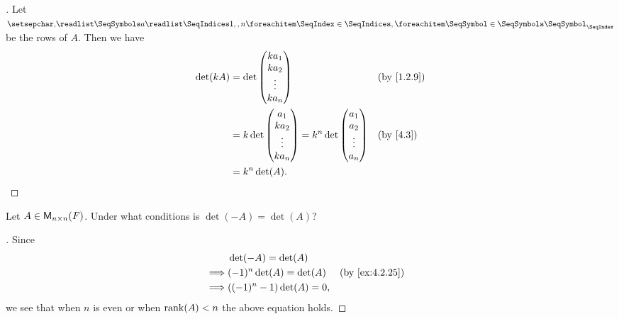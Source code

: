 \begin{proof}[]
	Let \(\seq{a}{1,,n}\) be the rows of \(A\).
	Then we have
	\begin{align*}
		\det(kA) & = \det\begin{pmatrix}
			                 k a_1  \\
			                 k a_2  \\
			                 \vdots \\
			                 k a_n
		                 \end{pmatrix}                   &  & \by{1.2.9}       \\
		         & = k \det\begin{pmatrix}
			                   a_1    \\
			                   k a_2  \\
			                   \vdots \\
			                   k a_n
		                   \end{pmatrix} = k^n \det\begin{pmatrix}
			                                           a_1    \\
			                                           a_2    \\
			                                           \vdots \\
			                                           a_n
		                                           \end{pmatrix} &  & \by{4.3} \\
		         & = k^n \det(A).
	\end{align*}
\end{proof}

\begin{ex}\label{ex:4.2.26}
	Let \(A \in \mathsf{M}_{{n} \times n}({\mathit{F}})\).
	Under what conditions is \(\det(-A) = \det(A)\)?
\end{ex}

\begin{proof}[]
	Since
	\begin{align*}
		         & \det(-A) = \det(A)                            \\
		\implies & (-1)^n \det(A) = \det(A)  &  & \by{ex:4.2.25} \\
		\implies & ((-1)^n - 1) \det(A) = 0,
	\end{align*}
	we see that when \(n\) is even or when \(\rk{A} < n\) the above equation holds.
\end{proof}

